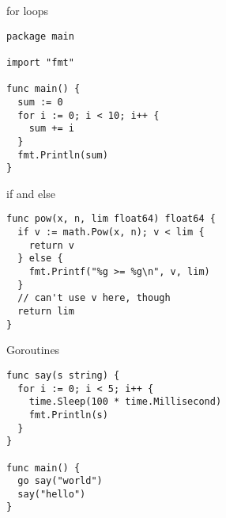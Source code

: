 \begin{frame}[fragile]{for loops}
  \begin{verbatim}
package main

import "fmt"

func main() {
  sum := 0
  for i := 0; i < 10; i++ {
    sum += i
  }
  fmt.Println(sum)
}
  \end{verbatim}
\end{frame}


\begin{frame}[fragile]{if and else}
  \begin{verbatim}
func pow(x, n, lim float64) float64 {
  if v := math.Pow(x, n); v < lim {
    return v
  } else {
    fmt.Printf("%g >= %g\n", v, lim)
  }
  // can't use v here, though
  return lim
}
  \end{verbatim}
\end{frame}

\begin{frame}[fragile]{Goroutines}
  \begin{verbatim}
func say(s string) {
  for i := 0; i < 5; i++ {
    time.Sleep(100 * time.Millisecond)
    fmt.Println(s)
  }
}

func main() {
  go say("world")
  say("hello")
}
  \end{verbatim}
\end{frame}